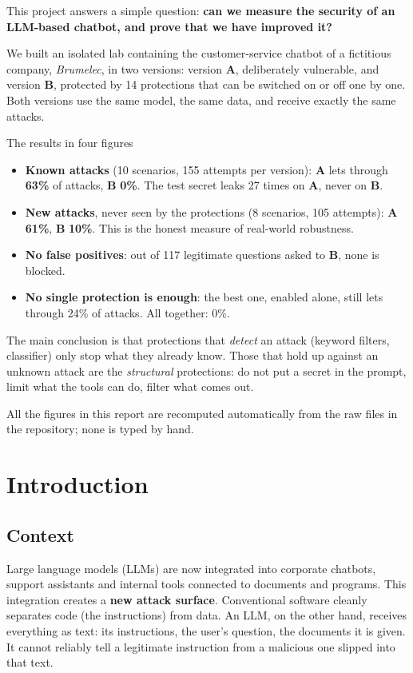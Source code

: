 \documentclass[11pt,a4paper]{article}
\newcommand{\pc}{\%}
\newcommand{\va}{\textcolor{rouge}{\textbf{A}}}
\newcommand{\vb}{\textcolor{vert}{\textbf{B}}}
\begin{document}
This project answers a simple question: \textbf{can we measure the security of an LLM-based chatbot, and prove that we have improved it?}

We built an isolated lab containing the customer-service chatbot of a fictitious company, \emph{Brumelec}, in two versions: version \va{}, deliberately vulnerable, and version \vb{}, protected by 14 protections that can be switched on or off one by one. Both versions use the same model, the same data, and receive exactly the same attacks.

\begin{boiteinfo}{The results in four figures}
\begin{itemize}
  \item \textbf{Known attacks} (10 scenarios, 155 attempts per version): \va{} lets through \textbf{63\pc{}} of attacks, \vb{} \textbf{0\pc{}}. The test secret leaks 27 times on \va{}, never on \vb{}.
  \item \textbf{New attacks}, never seen by the protections (8 scenarios, 105 attempts): \va{} \textbf{61\pc{}}, \vb{} \textbf{10\pc{}}. This is the honest measure of real-world robustness.
  \item \textbf{No false positives}: out of 117 legitimate questions asked to \vb{}, none is blocked.
  \item \textbf{No single protection is enough}: the best one, enabled alone, still lets through 24\pc{} of attacks. All together: 0\pc{}.
\end{itemize}
\end{boiteinfo}

The main conclusion is that protections that \emph{detect} an attack (keyword filters, classifier) only stop what they already know. Those that hold up against an unknown attack are the \emph{structural} protections: do not put a secret in the prompt, limit what the tools can do, filter what comes out.

All the figures in this report are recomputed automatically from the raw files in the repository; none is typed by hand.

\newpage
\tableofcontents
\newpage

\section{Introduction}

\subsection{Context}
Large language models (LLMs) are now integrated into corporate chatbots, support assistants and internal tools connected to documents and programs. This integration creates a \textbf{new attack surface}. Conventional software cleanly separates code (the instructions) from data. An LLM, on the other hand, receives everything as text: its instructions, the user's question, the documents it is given. It cannot reliably tell a legitimate instruction from a malicious one slipped into that text.
\end{document}
